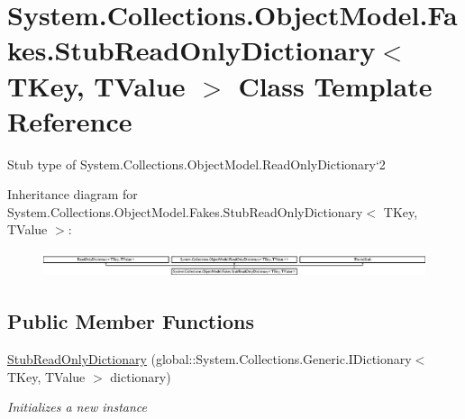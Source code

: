 \hypertarget{class_system_1_1_collections_1_1_object_model_1_1_fakes_1_1_stub_read_only_dictionary_3_01_t_key_00_01_t_value_01_4}{\section{System.\-Collections.\-Object\-Model.\-Fakes.\-Stub\-Read\-Only\-Dictionary$<$ T\-Key, T\-Value $>$ Class Template Reference}
\label{class_system_1_1_collections_1_1_object_model_1_1_fakes_1_1_stub_read_only_dictionary_3_01_t_key_00_01_t_value_01_4}
}


Stub type of System.\-Collections.\-Object\-Model.\-Read\-Only\-Dictionary`2 


Inheritance diagram for System.\-Collections.\-Object\-Model.\-Fakes.\-Stub\-Read\-Only\-Dictionary$<$ T\-Key, T\-Value $>$\-:\begin{figure}[H]
\begin{center}
\leavevmode
\includegraphics[height=0.769759cm]{class_system_1_1_collections_1_1_object_model_1_1_fakes_1_1_stub_read_only_dictionary_3_01_t_key_00_01_t_value_01_4}
\end{center}
\end{figure}
\subsection*{Public Member Functions}
\begin{DoxyCompactItemize}
\item 
\hyperlink{class_system_1_1_collections_1_1_object_model_1_1_fakes_1_1_stub_read_only_dictionary_3_01_t_key_00_01_t_value_01_4_a0c9e2768ac011a926a60dfb75451bcef}{Stub\-Read\-Only\-Dictionary} (global\-::\-System.\-Collections.\-Generic.\-I\-Dictionary$<$ T\-Key, T\-Value $>$ dictionary)
\begin{DoxyCompactList}\small\item\em Initializes a new instance\end{DoxyCompactList}\end{DoxyCompactItemize}

